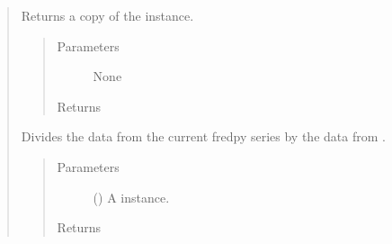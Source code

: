 \documentclass[letterpaper,10pt,openany,oneside,english]{sphinxmanual}
\begin{document}
\begin{fulllineitems}
\begin{quote}
\begin{fulllineitems}
\label{\detokenize{series_class:fredpy.series.copy}}
Returns a copy of the {\hyperref[\detokenize{series_class:fredpy.series}]{}} instance.
\begin{quote}\begin{description}
\item[{Parameters}] \leavevmode
None

\item[{Returns}] \leavevmode
{\hyperref[\detokenize{series_class:fredpy.series}]{}}

\end{description}\end{quote}

\end{fulllineitems}


\begin{fulllineitems}
\label{\detokenize{series_class:fredpy.series.divide}}
Divides the data from the current fredpy series by the data from .
\begin{quote}\begin{description}
\item[{Parameters}] \leavevmode
{} ({\hyperref[\detokenize{series_class:fredpy.series}]{}}) \textendash{} A {\hyperref[\detokenize{series_class:fredpy.series}]{}} instance.

\item[{Returns}] \leavevmode
{\hyperref[\detokenize{series_class:fredpy.series}]{}}

\end{description}\end{quote}

\end{fulllineitems}



\end{quote}
\end{fulllineitems}
\end{document}
